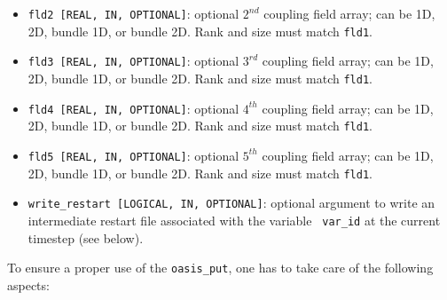 \begin{itemize}
\begin{itemize}
\begin{itemize}
    \end{itemize}
  \item {\tt fld2 [REAL, IN, OPTIONAL]}: optional $2^{nd}$ coupling
    field array; can be 1D, 2D, bundle 1D, or bundle 2D.  Rank and size
    must match {\tt fld1}.
  \item {\tt fld3 [REAL, IN, OPTIONAL]}: optional $3^{rd}$ coupling
    field array; can be 1D, 2D, bundle 1D, or bundle 2D.  Rank and size
    must match {\tt fld1}.
  \item {\tt fld4 [REAL, IN, OPTIONAL]}: optional $4^{th}$ coupling
    field array; can be 1D, 2D, bundle 1D, or bundle 2D.  Rank and size
    must match {\tt fld1}.
  \item {\tt fld5 [REAL, IN, OPTIONAL]}: optional $5^{th}$ coupling
    field array; can be 1D, 2D, bundle 1D, or bundle 2D.  Rank and size
    must match {\tt fld1}.
  \item {\tt write\_restart [LOGICAL, IN, OPTIONAL]}: optional argument to write an 
    intermediate restart file associated with the variable {\tt
      var\_id} at the current timestep (see below).
  \end{itemize}
\end{itemize}

To ensure a proper use of the {\tt oasis\_put}, one has to take care
of the following aspects:


